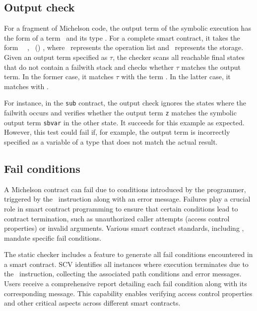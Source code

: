 \documentclass[runningheads]{llncs}
\begin{document}
\subsection{Output check}
\label{sec:output-check}
For a fragment of Michelson code, the output term of the symbolic
execution has the form of a term \Term\ and its type \TY. For a
complete smart contract, it takes the form \PAIR\ \VOPERATIONLIST\
\VSTORAGE, \TPAIR\ (\TOPERATIONLIST) \TYS, where \VOPERATIONLIST\
represents the operation list and \VSTORAGE\ represents
the storage. Given
an output term specified as $\tau$, the checker scans all reachable
final states that do not contain a failwith stack and checks whether
$\tau$ matches the output term. In the former case, it matches
$\tau$ with the term \Term. In the latter case, it matches with
\VSTORAGE.  

For instance, in the \lstinline|sub| contract, the output check ignores the states where the failwith occurs and verifies whether the output term \lstinline|z| matches the symbolic output term \lstinline/sbvar/ in the other state. It succeeds for this example as expected. However, this test could fail if, for example, the output term is incorrectly specified as a variable of a type that does not match the actual result.
\subsection{Fail conditions}
\label{sec:fail-conditions}
A Michelson contract can fail due to conditions introduced by the programmer, triggered by the \FAILWITH\ instruction along with an error message. Failures play a crucial role in smart contract programming to ensure that certain conditions lead to contract termination, such as unauthorized caller attempts (access control properties) or invalid arguments. Various smart contract standards, including \cite{erc,fa}, mandate specific fail conditions.

The static checker includes a feature to generate all fail conditions encountered in a smart contract. SCV identifies all instances where execution terminates due to the \FAILWITH\ instruction, collecting the associated path conditions and error messages. Users receive a comprehensive report detailing each fail condition along with its corresponding message. This capability enables verifying access control properties and other critical aspects across different smart contracts.
\end{document}
